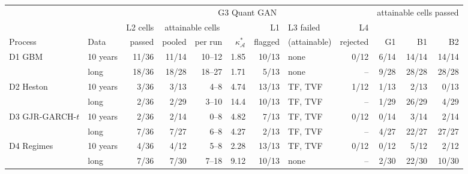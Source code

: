 \begin{tabular}{llrrrrrlrrrr}
\toprule
& & \multicolumn{7}{c}{G3 Quant GAN} & \multicolumn{3}{c}{attainable cells passed} \\
\cmidrule(lr){3-9}\cmidrule(lr){10-12}
& & L2 cells & \multicolumn{2}{c}{attainable cells} & & L1 & L3 failed & L4 & & & \\
\cmidrule(lr){4-5}
Process & Data & passed & pooled & per run & $\kappa^\ast_{\mathcal{A}}$ & flagged & (attainable) & rejected & G1 & B1 & B2 \\
\midrule
D1 GBM & 10 years & 11/36 & 11/14 & 10--12 & 1.85 & 10/13 & none & 0/12 & 6/14 & 14/14 & 14/14 \\
 & long & 18/36 & 18/28 & 18--27 & 1.71 & 5/13 & none & -- & 9/28 & 28/28 & 28/28 \\
\addlinespace
D2 Heston & 10 years & 3/36 & 3/13 & 4--8 & 4.74 & 13/13 & TF, TVF & 1/12 & 1/13 & 2/13 & 0/13 \\
 & long & 2/36 & 2/29 & 3--10 & 14.4 & 10/13 & TF, TVF & -- & 1/29 & 26/29 & 4/29 \\
\addlinespace
D3 GJR-GARCH-$t$ & 10 years & 2/36 & 2/14 & 0--8 & 4.82 & 7/13 & TF, TVF & 0/12 & 0/14 & 3/14 & 2/14 \\
 & long & 7/36 & 7/27 & 6--8 & 4.27 & 2/13 & TF, TVF & -- & 4/27 & 22/27 & 27/27 \\
\addlinespace
D4 Regimes & 10 years & 4/36 & 4/12 & 5--8 & 2.28 & 13/13 & TF, TVF & 0/12 & 0/12 & 5/12 & 2/12 \\
 & long & 7/36 & 7/30 & 7--18 & 9.12 & 10/13 & none & -- & 2/30 & 22/30 & 10/30 \\
\bottomrule
\end{tabular}
